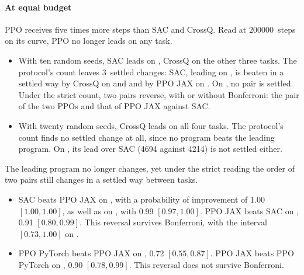 \paragraph{At equal budget}
PPO receives five times more steps than SAC and CrossQ. Read at \num{200000}~steps on its curve,
PPO no longer leads on any task.
\begin{itemize}
  \item With ten random seeds, SAC leads on , CrossQ on the other three tasks. The
    protocol's count leaves 3~settled changes: SAC, leading on , is beaten in a settled
    way by CrossQ on  and  and by PPO JAX on . On
    , no pair is settled. Under the strict count, two pairs reverse, with or without Bonferroni:
    the pair of the two PPOs and that of PPO JAX against SAC.
  \item With twenty random seeds, CrossQ leads on all four tasks. The protocol's count finds no settled
    change at all, since no program beats the leading program. On , its lead over SAC (\num{4694}
    against \num{4214}) is not settled either.
\end{itemize}
The leading program no longer changes, yet under the strict reading the order of two pairs still changes in a settled
way between tasks.
\begin{itemize}
  \item SAC beats PPO JAX on , with a probability of improvement of 1.00 $[1.00, 1.00]$, as well as
    on , with 0.99 $[0.97, 1.00]$. PPO JAX beats SAC on , 0.91 $[0.80, 0.99]$.
    This reversal survives Bonferroni, with the interval $[0.73, 1.00]$ on .
  \item PPO PyTorch beats PPO JAX on , 0.72 $[0.55, 0.87]$. PPO JAX beats PPO PyTorch on
    , 0.90 $[0.78, 0.99]$. This reversal does not survive Bonferroni.
\end{itemize}

